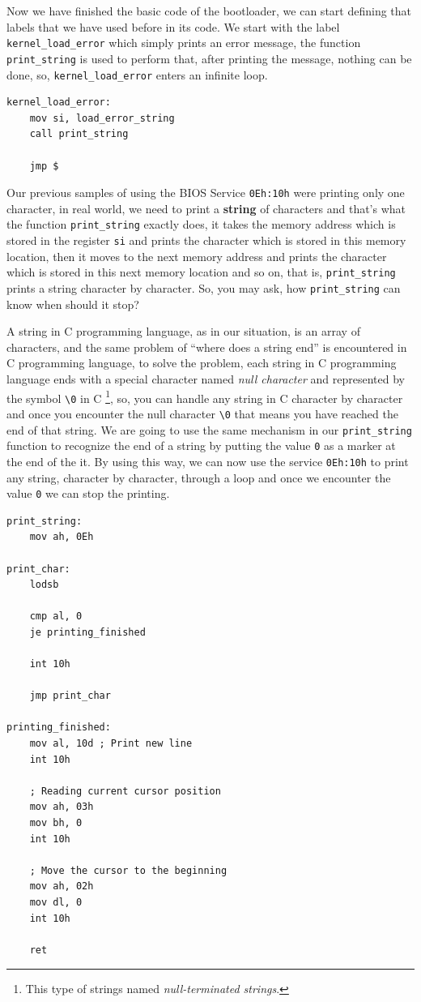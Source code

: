 Now we have finished the basic code of the bootloader, we can start
defining that labels that we have used before in its code. We start with
the label \lstinline!kernel_load_error! which simply prints an error
message, the function \lstinline!print_string! is used to perform that,
after printing the message, nothing can be done, so,
\lstinline!kernel_load_error! enters an infinite loop.

\begin{lstlisting}
kernel_load_error:
    mov si, load_error_string
    call print_string
    
    jmp $
\end{lstlisting}

Our previous samples of using the BIOS Service \lstinline!0Eh:10h! were
printing only one character, in real world, we need to print a
\textbf{string} of characters and that's what the function
\lstinline!print_string! exactly does, it takes the memory address which
is stored in the register \lstinline!si! and prints the character which
is stored in this memory location, then it moves to the next memory
address and prints the character which is stored in this next memory
location and so on, that is, \lstinline!print_string! prints a string
character by character. So, you may ask, how \lstinline!print_string!
can know when should it stop?

A string in C programming language, as in our situation, is an array of
characters, and the same problem of ``where does a string end'' is
encountered in C programming language, to solve the problem, each string
in C programming language ends with a special character named \emph{null
character} and represented by the symbol \lstinline!\0! in C \footnote{This
  type of strings named \emph{null-terminated strings}.}, so, you can
handle any string in C character by character and once you encounter the
null character \lstinline!\0! that means you have reached the end of
that string. We are going to use the same mechanism in our
\lstinline!print_string! function to recognize the end of a string by
putting the value \lstinline!0! as a marker at the end of the it. By
using this way, we can now use the service \lstinline!0Eh:10h! to print
any string, character by character, through a loop and once we encounter
the value \lstinline!0! we can stop the printing.

\begin{lstlisting}
print_string:
    mov ah, 0Eh

print_char:
    lodsb
    
    cmp al, 0
    je printing_finished
    
    int 10h
    
    jmp print_char

printing_finished:
    mov al, 10d ; Print new line
    int 10h
    
    ; Reading current cursor position
    mov ah, 03h
    mov bh, 0
    int 10h
    
    ; Move the cursor to the beginning
    mov ah, 02h
    mov dl, 0
    int 10h

    ret
\end{lstlisting}

